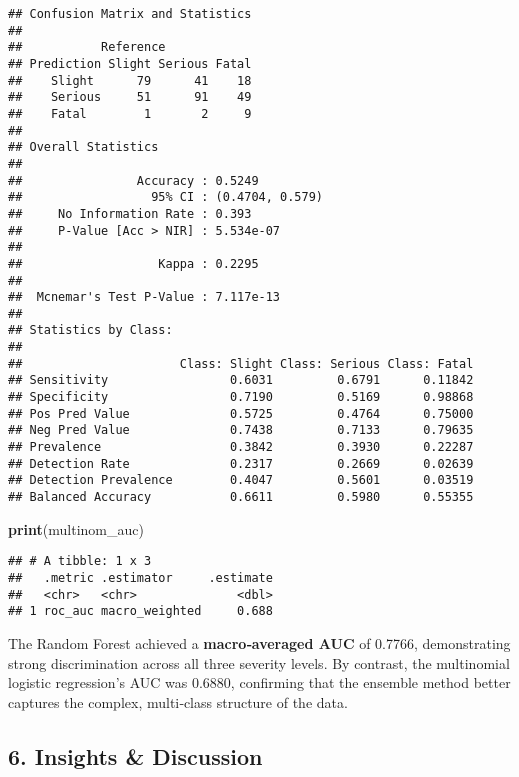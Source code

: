\documentclass[
]{article}
\newenvironment{Shaded}{\begin{snugshade}}{\end{snugshade}}
\newcommand{\FunctionTok}[1]{\textcolor[rgb]{0.13,0.29,0.53}{\textbf{#1}}}
\newcommand{\NormalTok}[1]{#1}
\begin{document}
\begin{verbatim}
## Confusion Matrix and Statistics
## 
##           Reference
## Prediction Slight Serious Fatal
##    Slight      79      41    18
##    Serious     51      91    49
##    Fatal        1       2     9
## 
## Overall Statistics
##                                          
##                Accuracy : 0.5249         
##                  95% CI : (0.4704, 0.579)
##     No Information Rate : 0.393          
##     P-Value [Acc > NIR] : 5.534e-07      
##                                          
##                   Kappa : 0.2295         
##                                          
##  Mcnemar's Test P-Value : 7.117e-13      
## 
## Statistics by Class:
## 
##                      Class: Slight Class: Serious Class: Fatal
## Sensitivity                 0.6031         0.6791      0.11842
## Specificity                 0.7190         0.5169      0.98868
## Pos Pred Value              0.5725         0.4764      0.75000
## Neg Pred Value              0.7438         0.7133      0.79635
## Prevalence                  0.3842         0.3930      0.22287
## Detection Rate              0.2317         0.2669      0.02639
## Detection Prevalence        0.4047         0.5601      0.03519
## Balanced Accuracy           0.6611         0.5980      0.55355
\end{verbatim}

\begin{Shaded}
\begin{Highlighting}[]
\FunctionTok{print}\NormalTok{(multinom\_auc)}
\end{Highlighting}
\end{Shaded}

\begin{verbatim}
## # A tibble: 1 x 3
##   .metric .estimator     .estimate
##   <chr>   <chr>              <dbl>
## 1 roc_auc macro_weighted     0.688
\end{verbatim}

The Random Forest achieved a \textbf{macro‑averaged AUC} of 0.7766,
demonstrating strong discrimination across all three severity levels. By
contrast, the multinomial logistic regression's AUC was 0.6880,
confirming that the ensemble method better captures the complex,
multi‑class structure of the data.

\subsection{6. Insights \& Discussion}\label{insights-discussion}
\end{document}
